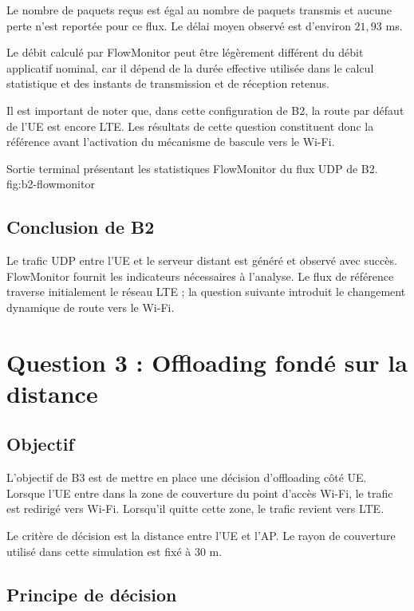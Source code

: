 Le nombre de paquets reçus est égal au nombre de paquets
transmis et aucune perte n'est reportée pour ce flux.
Le délai moyen observé est d'environ $21,93$ ms.

Le débit calculé par FlowMonitor peut être légèrement
différent du débit applicatif nominal, car il dépend
de la durée effective utilisée dans le calcul statistique
et des instants de transmission et de réception retenus.

Il est important de noter que, dans cette configuration
de B2, la route par défaut de l'UE est encore LTE. Les
résultats de cette question constituent donc la référence
avant l'activation du mécanisme de bascule vers le Wi-Fi.

{Sortie terminal présentant les statistiques FlowMonitor du flux UDP de B2.}
{fig:b2-flowmonitor}

\subsection{Conclusion de B2}

Le trafic UDP entre l'UE et le serveur distant est généré
et observé avec succès. FlowMonitor fournit les indicateurs
nécessaires à l'analyse. Le flux de référence traverse
initialement le réseau LTE ; la question suivante introduit
le changement dynamique de route vers le Wi-Fi.

\section{Question 3 : Offloading fondé sur la distance}

\subsection{Objectif}

L'objectif de B3 est de mettre en place une décision
d'offloading côté UE. Lorsque l'UE entre dans la zone
de couverture du point d'accès Wi-Fi, le trafic est
redirigé vers Wi-Fi. Lorsqu'il quitte cette zone, le
trafic revient vers LTE.

Le critère de décision est la distance entre l'UE et
l'AP. Le rayon de couverture utilisé dans cette simulation
est fixé à $30$ m.

\subsection{Principe de décision}

